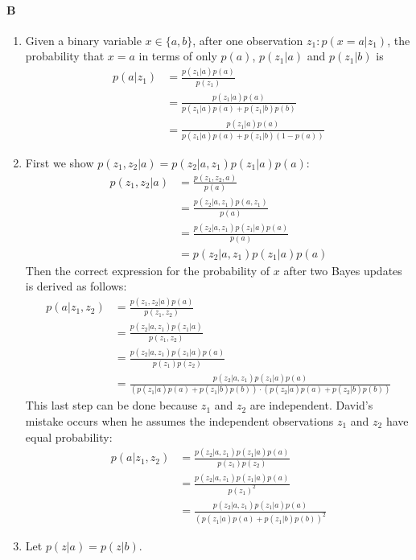 \documentclass[12pt]{article}
\begin{document}
\paragraph{B}
\begin{enumerate}
	\item  Given a binary variable $x\in\{a,b\}$, after one observation $z_1: p(x = a | z_1)$, the probability that $x=a$ in terms of only $p(a)$, $p(z_1| a)$ and $p(z_1 | b)$ is
	\begin{align*}
	p(a|z_1) &= \frac{p(z_1|a)p(a)}{p(z_1)} \\
						&= \frac{p(z_1|a)p(a)}{p(z_1|a)p(a) + p(z_1|b)p(b)} \\
						&= \frac{p(z_1|a)p(a)}{p(z_1|a)p(a) + p(z_1|b)(1-p(a))}
	\end{align*}
	\item  First we show $p(z_1,z_2|a) = p(z_2|a,z_1)p(z_1|a)p(a)$:
	\begin{align*}
	p(z_1,z_2|a) &= \frac{p(z_1,z_2,a)}{p(a)} \\
			     &= \frac{p(z_2|a,z_1)p(a,z_1)}{p(a)} \\
			     &= \frac{p(z_2|a,z_1)p(z_1|a)p(a)}{p(a)}\\
			     &=p(z_2|a,z_1)p(z_1|a)p(a)
	\end{align*}
	Then the correct expression for the probability of $x$ after two Bayes updates is derived as follows:
	\begin{align*}
	p(a|z_1,z_2) &= \frac{p(z_1,z_2|a)p(a)}{p(z_1,z_2)} \\
			     &= \frac{p(z_2|a,z_1)p(z_1|a)}{p(z_1,z_2)} \\
			     &= \frac{p(z_2|a,z_1)p(z_1|a)p(a)}{p(z_1)p(z_2)}\\
			     &= \frac{p(z_2|a,z_1)p(z_1|a)p(a)}{(p(z_1|a)p(a)+p(z_1|b)p(b))\cdot(p(z_2|a)p(a)+p(z_2|b)p(b))}
	\end{align*}
	This last step can be done because $z_1$ and $z_2$ are independent.  David's mistake occurs when he assumes the independent observations $z_1$ and $z_2$ have equal probability:
	\begin{align*}
	p(a|z_1,z_2) &= \frac{p(z_2|a,z_1)p(z_1|a)p(a)}{p(z_1)p(z_2)} \\
			     &= \frac{p(z_2|a,z_1)p(z_1|a)p(a)}{p(z_1)^2} \\
			     &= \frac{p(z_2|a,z_1)p(z_1|a)p(a)}{(p(z_1|a)p(a)+p(z_1|b)p(b))^2}
	\end{align*}
	\item  Let $p(z | a) = p(z | b)$.
	\begin{align*}

\end{align*}
\end{enumerate}
\end{document}
